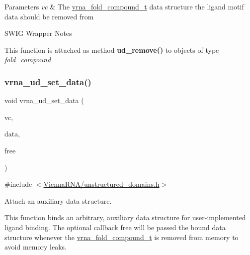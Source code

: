 \begin{DoxyParams}{Parameters}
{\em vc} & The \mbox{\hyperlink{group__fold__compound_ga1b0cef17fd40466cef5968eaeeff6166}{vrna\+\_\+fold\+\_\+compound\+\_\+t}} data structure the ligand motif data should be removed from\\
\hline
\end{DoxyParams}
\begin{DoxyRefDesc}{S\+W\+I\+G Wrapper Notes}
\item[\mbox{\hyperlink{wrappers__wrappers000069}{S\+W\+I\+G Wrapper Notes}}]This function is attached as method {\bfseries ud\+\_\+remove()} to objects of type {\itshape fold\+\_\+compound} \end{DoxyRefDesc}
\mbox{\label{group__domains__up_gac1f18c312b91d80089534a87d956e58b}} 
\subsubsection{\texorpdfstring{vrna\+\_\+ud\+\_\+set\+\_\+data()}{vrna\_ud\_set\_data()}}
{\footnotesize\ttfamily void vrna\+\_\+ud\+\_\+set\+\_\+data (\begin{DoxyParamCaption}\item[{\mbox{\hyperlink{group__fold__compound_ga1b0cef17fd40466cef5968eaeeff6166}{vrna\+\_\+fold\+\_\+compound\+\_\+t}} $\ast$}]{vc,  }\item[{void $\ast$}]{data,  }\item[{\mbox{\hyperlink{group__fold__compound_ga7806651f51b195013839a218b3bbd5a3}{vrna\+\_\+callback\+\_\+free\+\_\+auxdata}} $\ast$}]{free }\end{DoxyParamCaption})}



{\ttfamily \#include $<$\mbox{\hyperlink{unstructured__domains_8h}{Vienna\+R\+N\+A/unstructured\+\_\+domains.\+h}}$>$}



Attach an auxiliary data structure. 

This function binds an arbitrary, auxiliary data structure for user-\/implemented ligand binding. The optional callback {\ttfamily free} will be passed the bound data structure whenever the \mbox{\hyperlink{group__fold__compound_ga1b0cef17fd40466cef5968eaeeff6166}{vrna\+\_\+fold\+\_\+compound\+\_\+t}} is removed from memory to avoid memory leaks.

